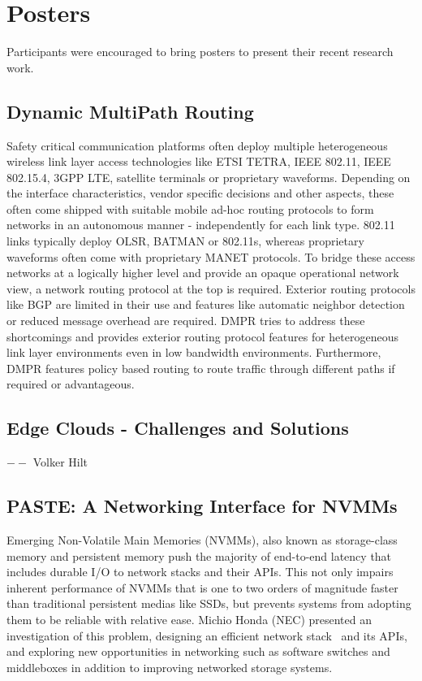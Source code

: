 \section{Posters}\label{sec:posters}

Participants were encouraged to bring posters to present
their recent research work.

\subsection{Dynamic MultiPath Routing}

Safety critical communication platforms often deploy multiple heterogeneous
wireless link layer access technologies like ETSI TETRA, IEEE 802.11, IEEE
802.15.4, 3GPP LTE, satellite terminals or proprietary waveforms.  Depending
on the interface characteristics, vendor specific decisions and other aspects,
these often come shipped with suitable mobile ad-hoc routing protocols to form
networks in an autonomous manner - independently for each link type. 802.11
links typically deploy OLSR, BATMAN or 802.11s, whereas proprietary waveforms
often come with proprietary MANET protocols.  To bridge these access networks
at a logically higher level and provide an opaque operational network view, a
network routing protocol at the top is required. Exterior routing protocols
like BGP are limited in their use and features like automatic neighbor
detection or reduced message overhead are required. \ac{DMPR} tries to address
these shortcomings and provides exterior routing protocol features for
heterogeneous link layer environments even in low bandwidth environments.
Furthermore, \ac{DMPR} features policy based routing to route traffic through
different paths if required or advantageous.

\subsection{Edge Clouds - Challenges and Solutions}
$--$ Volker Hilt

\subsection{PASTE: A Networking Interface for NVMMs}

Emerging Non-Volatile Main Memories (NVMMs), also known as storage-class
memory and persistent memory  push the majority of end-to-end latency that
includes durable I/O to network stacks and their APIs.  This not only impairs
inherent performance of NVMMs that is one to two orders of magnitude faster
than traditional persistent medias like SSDs, but prevents systems from
adopting them to be reliable with relative ease. Michio Honda (NEC) presented
an investigation of this problem, designing an efficient network
stack~\cite{mhonda:hotnets:2016} and its APIs, and exploring new opportunities
in networking such as software switches and middleboxes in addition to
improving networked storage systems.

